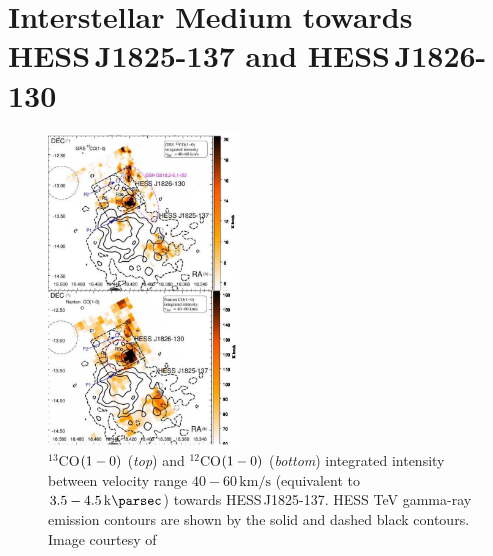 \chapter[ISM towards \mbox{HESS\,J1825-137} and \mbox{HESS\,J1826-130}]{Interstellar Medium towards \\ \mbox{HESS\,J1825-137} and \mbox{HESS\,J1826-130}} \label{06_ISM}

\begin{figure}
	\centering
	\includegraphics[width=0.45\textwidth]{06_Interstellar_Medium/Images/18252.png}
    \caption{$^{13}$CO$\qty(1-0)$ (\textit{top}) and $^{12}$CO$\qty(1-0)$ (\textit{bottom}) integrated intensity between velocity range $40-60\,\si{\kilo\meter\per\second}$ (equivalent to $3.5-4.5\,\kpc$) towards \mbox{HESS\,J1825-137}. HESS TeV gamma-ray emission contours are shown by the solid and dashed black contours. Image courtesy of \citep{2016MNRAS.458.2813V}}
	\label{fig:chapter_6_1825_gas}
\end{figure}

